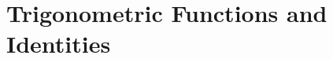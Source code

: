 \documentclass[../../main.tex]{subfiles}
\begin{document}
\chapter{Trigonometric Functions and Identities}
\end{document}
